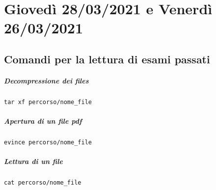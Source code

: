 \documentclass[11pt]{report}
\theoremstyle{definition}
\begin{document}
\chapter{Giovedì 28/03/2021 e Venerdì 26/03/2021}
\section{Comandi per la lettura di esami passati}
\small
\begin{multicols}{3}
\paragraph{Decompressione dei files}
\begin{verbatim}
tar xf percorso/nome_file
\end{verbatim}
\paragraph{Apertura di un file pdf}
\begin{verbatim}
evince percorso/nome_file
\end{verbatim}
\paragraph{Lettura di un file} 
\begin{verbatim}
cat percorso/nome_file
\end{verbatim}
\end{multicols}
\normalsize
\end{document}
